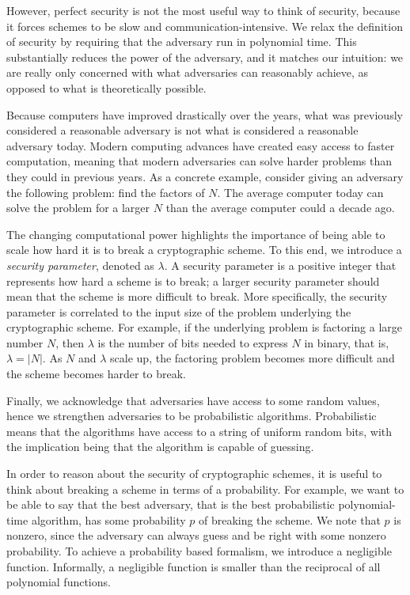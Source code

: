 However, perfect security is not the most useful way to think of security, because it forces schemes to be slow and communication-intensive.
We relax the definition of security by requiring that the adversary run in polynomial time. 
This substantially reduces the power of the adversary, and it matches our intuition: we are really only concerned with what adversaries can reasonably achieve, as opposed to what is theoretically possible. 

Because computers have improved drastically over the years, what was previously considered a reasonable adversary is not what is considered a reasonable adversary today. 
Modern computing advances have created easy access to faster computation, meaning that modern adversaries can solve harder problems than they could in previous years. 
As a concrete example, consider giving an adversary the following problem: find the factors of $N$. 
The average computer today can solve the problem for a larger $N$ than the average computer could a decade ago.

The changing computational power highlights the importance of being able to scale how hard it is to break a cryptographic scheme.
To this end, we introduce a \textit{security parameter}, denoted as $\lambda$.
A security parameter is a positive integer that represents how hard a scheme is to break; a larger security parameter should mean that the scheme is more difficult to break. 
More specifically, the security parameter is correlated to the input size of the problem underlying the cryptographic scheme. 
For example, if the underlying problem is factoring a large number $N$, then $\lambda$ is the number of bits needed to express $N$ in binary, that is, $\lambda = |N|$.
As $N$ and $\lambda$ scale up, the factoring problem becomes more difficult and the scheme becomes harder to break. 

Finally, we acknowledge that adversaries have access to some random values, hence we strengthen adversaries to be probabilistic algorithms. 
Probabilistic means that the algorithms have access to a string of uniform random bits, with the implication being that the algorithm is capable of guessing. 

In order to reason about the security of cryptographic schemes, it is useful to think about breaking a scheme in terms of a probability. 
For example, we want to be able to say that the best adversary, that is the best probabilistic polynomial-time algorithm, has some probability $p$ of breaking the scheme. 
We note that $p$ is nonzero, since the adversary can always guess and be right with some nonzero probability. 
To achieve a probability based formalism, we introduce a negligible function.
Informally, a negligible function is smaller than the reciprocal of all polynomial functions.

